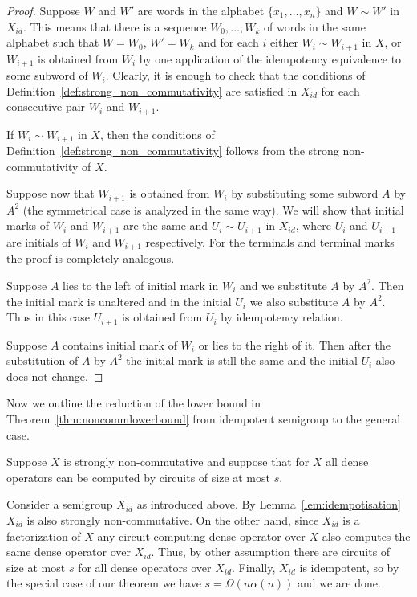 \documentclass[11pt,letterpaper]{article}
\begin{document}
\begin{proof}
Suppose $W$ and $W'$ are words in the alphabet $\{x_1,\ldots, x_n\}$ and $W \sim W'$ in $X_{id}$. This means that there is a sequence $W_0,\ldots, W_k$ of words in the same alphabet such that $W=W_0$, $W'=W_k$ and for each $i$ either $W_i \sim W_{i+1}$ in $X$, or $W_{i+1}$ is obtained from $W_i$ by one application of the idempotency equivalence to some subword of $W_i$. Clearly, it is enough to check that the conditions of Definition~\ref{def:strong_non_commutativity} are satisfied in $X_{id}$ for each consecutive pair $W_i$ and $W_{i+1}$.

If $W_i \sim W_{i+1}$ in $X$, then the conditions of Definition~\ref{def:strong_non_commutativity} follows from the strong non-commutativity of $X$.

Suppose now that $W_{i+1}$ is obtained from $W_{i}$ by substituting some subword $A$ by $A^2$ (the symmetrical case is analyzed in the same way). We will show that initial marks of $W_i$ and $W_{i+1}$ are the same and $U_{i} \sim U_{i+1}$ in $X_{id}$, where $U_{i}$ and $U_{i+1}$ are initials of $W_i$ and $W_{i+1}$ respectively. For the terminals and terminal marks the proof is completely analogous.

Suppose $A$ lies to the left of initial mark in $W_i$ and we substitute $A$ by $A^2$. Then the initial mark is unaltered and in the initial $U_i$ we also substitute $A$ by $A^2$. Thus in this case $U_{i+1}$ is obtained from $U_i$ by idempotency relation.

Suppose $A$ contains initial mark of $W_i$ or lies to the right of it. Then after the substitution of $A$ by $A^2$ the initial mark is still the same and the initial $U_i$ also does not change.
\end{proof}

Now we outline the reduction of the lower bound in Theorem~\ref{thm:noncommlowerbound} from idempotent semigroup to the general case.

Suppose $X$ is strongly non-commutative and suppose that for $X$ all dense operators can be computed by circuits of size at most $s$.

Consider a semigroup $X_{id}$ as introduced above. By Lemma~\ref{lem:idempotisation} $X_{id}$ is also strongly non-commutative. On the other hand, since $X_{id}$ is a factorization of $X$ any circuit computing dense operator over $X$ also computes the same dense operator over $X_{id}$. Thus, by other assumption there are circuits of size at most $s$ for all dense operators over $X_{id}$. Finally, $X_{id}$ is idempotent, so by the special case of our theorem we have $s = \Omega(n \alpha(n))$ and we are done.
\end{document}
